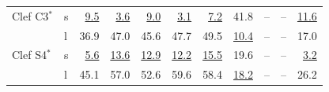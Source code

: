 \begin{table}[tp]
\begin{tabular}{llrrrrrrrrr}
Clef C3$^\ast$ & s & \underline{9.5} & \underline{3.6} & \underline{9.0} & \underline{3.1} & \underline{7.2} & 41.8 & -- & -- & \underline{11.6} \\
 & l & 36.9 & 47.0 & 45.6 & 47.7 & 49.5 & \underline{10.4} & -- & -- & 17.0 \\
Clef S4$^\ast$ & s & \underline{5.6} & \underline{13.6} & \underline{12.9} & \underline{12.2} & \underline{15.5} & 19.6 & -- & -- & \underline{3.2} \\
 & l & 45.1 & 57.0 & 52.6 & 59.6 & 58.4 & \underline{18.2} & -- & -- & 26.2 \\
\bottomrule
\end{tabular}
\end{table}